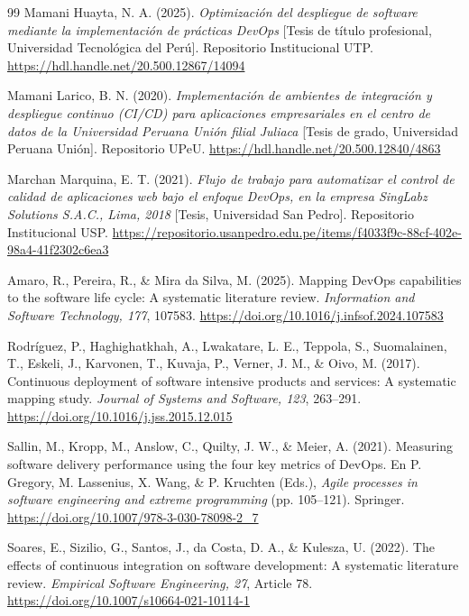 \documentclass[12pt,a4paper]{article}
\begin{document}
\begin{thebibliography}{99}
Mamani Huayta, N. A. (2025). \textit{Optimización del despliegue de software mediante la implementación de prácticas DevOps} [Tesis de título profesional, Universidad Tecnológica del Perú]. Repositorio Institucional UTP. \url{https://hdl.handle.net/20.500.12867/14094}

Mamani Larico, B. N. (2020). \textit{Implementación de ambientes de integración y despliegue continuo (CI/CD) para aplicaciones empresariales en el centro de datos de la Universidad Peruana Unión filial Juliaca} [Tesis de grado, Universidad Peruana Unión]. Repositorio UPeU. \url{https://hdl.handle.net/20.500.12840/4863}

Marchan Marquina, E. T. (2021). \textit{Flujo de trabajo para automatizar el control de calidad de aplicaciones web bajo el enfoque DevOps, en la empresa SingLabz Solutions S.A.C., Lima, 2018} [Tesis, Universidad San Pedro]. Repositorio Institucional USP. \url{https://repositorio.usanpedro.edu.pe/items/f4033f9c-88cf-402e-98a4-41f2302c6ea3}

Amaro, R., Pereira, R., \& Mira da Silva, M. (2025). Mapping DevOps capabilities to the software life cycle: A systematic literature review. \textit{Information and Software Technology, 177}, 107583. \url{https://doi.org/10.1016/j.infsof.2024.107583}

Rodríguez, P., Haghighatkhah, A., Lwakatare, L. E., Teppola, S., Suomalainen, T., Eskeli, J., Karvonen, T., Kuvaja, P., Verner, J. M., \& Oivo, M. (2017). Continuous deployment of software intensive products and services: A systematic mapping study. \textit{Journal of Systems and Software, 123}, 263--291. \url{https://doi.org/10.1016/j.jss.2015.12.015}

Sallin, M., Kropp, M., Anslow, C., Quilty, J. W., \& Meier, A. (2021). Measuring software delivery performance using the four key metrics of DevOps. En P. Gregory, M. Lassenius, X. Wang, \& P. Kruchten (Eds.), \textit{Agile processes in software engineering and extreme programming} (pp. 105--121). Springer. \url{https://doi.org/10.1007/978-3-030-78098-2_7}

Soares, E., Sizilio, G., Santos, J., da Costa, D. A., \& Kulesza, U. (2022). The effects of continuous integration on software development: A systematic literature review. \textit{Empirical Software Engineering, 27}, Article 78. \url{https://doi.org/10.1007/s10664-021-10114-1}

\end{thebibliography}
\end{document}
